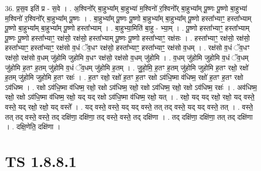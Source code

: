 \documentclass[17pt]{extarticle}
\begin{document}
36. प्र॒स॒व इति॑ प्र - स॒वे । . अ॒श्विनो᳚र् बा॒हुभ्या᳚म् बा॒हुभ्या॑ म॒श्विनो॑ र॒श्विनो᳚र् बा॒हुभ्या᳚म् पू॒ष्णः पू॒ष्णो बा॒हुभ्या॑ म॒श्विनो॑ र॒श्विनो᳚र् बा॒हुभ्या᳚म् पू॒ष्णः । . बा॒हुभ्या᳚म् पू॒ष्णः पू॒ष्णो बा॒हुभ्या᳚म् बा॒हुभ्या᳚म् पू॒ष्णो हस्ता᳚भ्याꣳ॒॒ हस्ता᳚भ्याम् पू॒ष्णो बा॒हुभ्या᳚म् बा॒हुभ्या᳚म् पू॒ष्णो हस्ता᳚भ्याम् । . बा॒हुभ्या॒मिति॑ बा॒हु - भ्या॒म् । . पू॒ष्णो हस्ता᳚भ्याꣳ॒॒ हस्ता᳚भ्याम् पू॒ष्णः पू॒ष्णो हस्ता᳚भ्याꣳ॒॒ रक्ष॑सो॒ रक्ष॑सो॒ हस्ता᳚भ्याम् पू॒ष्णः पू॒ष्णो हस्ता᳚भ्याꣳ॒॒ रक्ष॑सः । . हस्ता᳚भ्याꣳ॒॒ रक्ष॑सो॒ रक्ष॑सो॒ हस्ता᳚भ्याꣳ॒॒ हस्ता᳚भ्याꣳ॒॒ रक्ष॑सो व॒धं ॅव॒धꣳ रक्ष॑सो॒ हस्ता᳚भ्याꣳ॒॒ हस्ता᳚भ्याꣳ॒॒ रक्ष॑सो व॒धम् । . रक्ष॑सो व॒धं ॅव॒धꣳ रक्ष॑सो॒ रक्ष॑सो व॒धम् जु॑होमि जुहोमि व॒धꣳ रक्ष॑सो॒ रक्ष॑सो व॒धम् जु॑होमि । . व॒धम् जु॑होमि जुहोमि व॒धं ॅव॒धम् जु॑होमि ह॒तꣳ ह॒तम् जु॑होमि व॒धं ॅव॒धम् जु॑होमि ह॒तम् । . जु॒हो॒मि॒ ह॒तꣳ ह॒तम् जु॑होमि जुहोमि ह॒तꣳ रक्षो॒ रक्षो॑ ह॒तम् जु॑होमि जुहोमि ह॒तꣳ रक्षः॑ । . ह॒तꣳ रक्षो॒ रक्षो॑ ह॒तꣳ ह॒तꣳ रक्षो ऽव॑धि॒ष्मा व॑धिष्म॒ रक्षो॑ ह॒तꣳ ह॒तꣳ रक्षो ऽव॑धिष्म । . रक्षो ऽव॑धि॒ष्मा व॑धिष्म॒ रक्षो॒ रक्षो ऽव॑धिष्म॒ रक्षो॒ रक्षो ऽव॑धिष्म॒ रक्षो॒ रक्षो ऽव॑धिष्म॒ रक्षः॑ । . अव॑धिष्म॒ रक्षो॒ रक्षो ऽव॑धि॒ष्मा व॑धिष्म॒ रक्षो॒ यद् यद् रक्षो ऽव॑धि॒ष्मा व॑धिष्म॒ रक्षो॒ यत् । . रक्षो॒ यद् यद् रक्षो॒ रक्षो॒ यद् वस्ते॒ वस्ते॒ यद् रक्षो॒ रक्षो॒ यद् वस्ते᳚ । . यद् वस्ते॒ वस्ते॒ यद् यद् वस्ते॒ तत् तद् वस्ते॒ यद् यद् वस्ते॒ तत् । . वस्ते॒ तत् तद् वस्ते॒ वस्ते॒ तद् दक्षि॑णा॒ दक्षि॑णा॒ तद् वस्ते॒ वस्ते॒ तद् दक्षि॑णा । . तद् दक्षि॑णा॒ दक्षि॑णा॒ तत् तद् दक्षि॑णा । . दक्षि॒णेति॒ दक्षि॑णा । \newline
\pagebreak
{}
\section*{ TS 1.8.8.1 }
\end{document}
